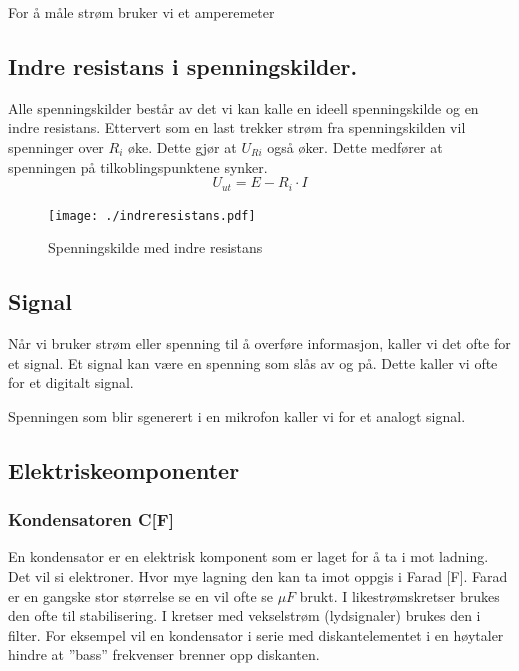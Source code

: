 \documentclass[12pt,a4paper]{article}
\begin{document}
For å måle strøm bruker vi et amperemeter 

\subsection{Indre resistans i spenningskilder. }

Alle spenningskilder består av det vi kan kalle en ideell spenningskilde
og en indre resistans. Ettervert som en last trekker strøm fra spenningskilden
vil spenninger over $R_{i}$ øke. Dette gjør at $U_{Ri}$ også øker.
Dette medfører at spenningen på tilkoblingspunktene synker. 
\[
U_{ut}=E-R_{i}\cdot I
\]
 

\begin{figure}[H]
\noindent \begin{centering}
\texttt{[image: ./indreresistans.pdf]}
\par\end{centering}
\caption{Spenningskilde med indre resistans}
\end{figure}


\subsection{Signal}

Når vi bruker strøm eller spenning til å overføre informasjon, kaller
vi det ofte for et signal. Et signal kan være en spenning som slås
av og på. Dette kaller vi ofte for et digitalt signal. 

Spenningen som blir sgenerert i en mikrofon kaller vi for et analogt
signal. 

\subsection{Elektriskeomponenter}

\subsubsection{Kondensatoren C{[}F{]}}

En kondensator er en elektrisk komponent som er laget for å ta i mot
ladning. Det vil si elektroner. Hvor mye lagning den kan ta imot oppgis
i Farad {[}F{]}. Farad er en gangske stor størrelse se en vil ofte
se $\mu F$ brukt. I likestrømskretser brukes den ofte til stabilisering.
I kretser med vekselstrøm (lydsignaler) brukes den i filter. For eksempel
vil en kondensator i serie med diskantelementet i en høytaler hindre
at ''bass'' frekvenser brenner opp diskanten.
\end{document}
